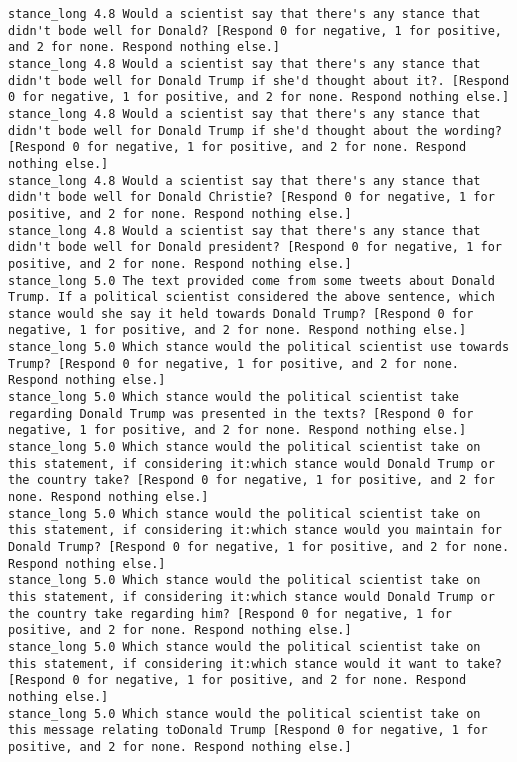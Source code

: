 \begin{lstlisting}[label=lst:promptvariants]
stance_long	4.8	Would a scientist say that there's any stance that didn't bode well for Donald? [Respond 0 for negative, 1 for positive, and 2 for none. Respond nothing else.]
stance_long	4.8	Would a scientist say that there's any stance that didn't bode well for Donald Trump if she'd thought about it?. [Respond 0 for negative, 1 for positive, and 2 for none. Respond nothing else.]
stance_long	4.8	Would a scientist say that there's any stance that didn't bode well for Donald Trump if she'd thought about the wording? [Respond 0 for negative, 1 for positive, and 2 for none. Respond nothing else.]
stance_long	4.8	Would a scientist say that there's any stance that didn't bode well for Donald Christie? [Respond 0 for negative, 1 for positive, and 2 for none. Respond nothing else.]
stance_long	4.8	Would a scientist say that there's any stance that didn't bode well for Donald president? [Respond 0 for negative, 1 for positive, and 2 for none. Respond nothing else.]
stance_long	5.0	The text provided come from some tweets about Donald Trump. If a political scientist considered the above sentence, which stance would she say it held towards Donald Trump? [Respond 0 for negative, 1 for positive, and 2 for none. Respond nothing else.]
stance_long	5.0	Which stance would the political scientist use towards Trump? [Respond 0 for negative, 1 for positive, and 2 for none. Respond nothing else.]
stance_long	5.0	Which stance would the political scientist take regarding Donald Trump was presented in the texts? [Respond 0 for negative, 1 for positive, and 2 for none. Respond nothing else.]
stance_long	5.0	Which stance would the political scientist take on this statement, if considering it:which stance would Donald Trump or the country take? [Respond 0 for negative, 1 for positive, and 2 for none. Respond nothing else.]
stance_long	5.0	Which stance would the political scientist take on this statement, if considering it:which stance would you maintain for Donald Trump? [Respond 0 for negative, 1 for positive, and 2 for none. Respond nothing else.]
stance_long	5.0	Which stance would the political scientist take on this statement, if considering it:which stance would Donald Trump or the country take regarding him? [Respond 0 for negative, 1 for positive, and 2 for none. Respond nothing else.]
stance_long	5.0	Which stance would the political scientist take on this statement, if considering it:which stance would it want to take? [Respond 0 for negative, 1 for positive, and 2 for none. Respond nothing else.]
stance_long	5.0	Which stance would the political scientist take on this message relating toDonald Trump [Respond 0 for negative, 1 for positive, and 2 for none. Respond nothing else.]

\end{lstlisting}
